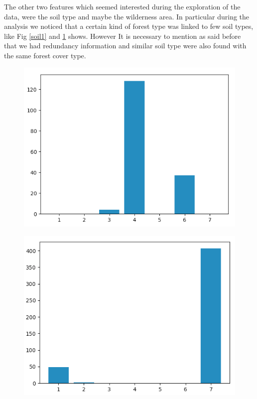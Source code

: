 \documentclass[a4paper, 11pt]{article}
\begin{document}
The other two features which seemed interested during the exploration of the data, were the soil type and maybe the wilderness area. In particular during the analysis we noticed that a certain kind of forest type was linked to few soil types, like Fig \ref{soil1} and \ref{soil2} shows. However It is necessary to mention as said before that we had redundancy information and similar soil type were also found with the same forest cover type. 

\begin{figure}[htb]
\centering
\begin{minipage}{.5\textwidth}
  \centering
  \includegraphics[width=1.01\textwidth]{img/soil_type_14}
  \label{soil1}
\end{minipage}%
\begin{minipage}{.5\textwidth}
  \centering
  \includegraphics[width=1\textwidth]{img/soil_type_40}
  \label{soil2}
\end{minipage}
\end{figure}
\end{document}
